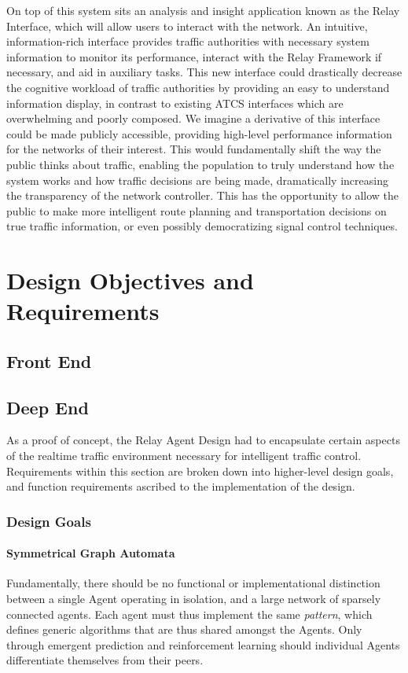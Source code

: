 \documentclass{report}
\begin{document}
On top of this system sits an analysis and insight application known as the Relay Interface, which will allow users to interact with the network.
An intuitive, information-rich interface provides traffic authorities with necessary system information to monitor its performance, interact with the Relay Framework if necessary, and aid in auxiliary tasks.
This new interface could drastically decrease the cognitive workload of traffic authorities by providing an easy to understand information display, in contrast to existing ATCS interfaces which are overwhelming and poorly composed.
We imagine a derivative of this interface could be made publicly accessible, providing high-level performance information for the networks of their interest.
This would fundamentally shift the way the public thinks about traffic, enabling the population to truly understand how the system works and how traffic decisions are being made, dramatically increasing the transparency of the network controller.
This has the opportunity to allow the public to make more intelligent route planning and transportation decisions on true traffic information, or even possibly democratizing signal control techniques.

\newpage
\chapter{Design Objectives and Requirements}
\section{Front End}


\section{Deep End}
\label{sec:deep:design_requirements}

As a proof of concept, the Relay Agent Design had to encapsulate certain aspects of the realtime traffic environment necessary for intelligent traffic control.
Requirements within this section are broken down into higher-level design goals, and function requirements ascribed to the implementation of the design.

\subsection{Design Goals}
\subsubsection{Symmetrical Graph Automata}
Fundamentally, there should be no functional or implementational distinction between a single Agent operating in isolation, and a large network of sparsely connected agents.
Each agent must thus implement the same \emph{pattern}, which defines generic algorithms that are thus shared amongst the Agents.
Only through emergent prediction and reinforcement learning should individual Agents differentiate themselves from their peers.
\end{document}
